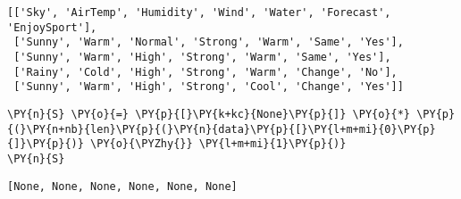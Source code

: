             \begin{tcolorbox}[breakable, size=fbox, boxrule=.5pt, pad at break*=1mm, opacityfill=0]
\begin{Verbatim}[commandchars=\\\{\}]
[['Sky', 'AirTemp', 'Humidity', 'Wind', 'Water', 'Forecast', 'EnjoySport'],
 ['Sunny', 'Warm', 'Normal', 'Strong', 'Warm', 'Same', 'Yes'],
 ['Sunny', 'Warm', 'High', 'Strong', 'Warm', 'Same', 'Yes'],
 ['Rainy', 'Cold', 'High', 'Strong', 'Warm', 'Change', 'No'],
 ['Sunny', 'Warm', 'High', 'Strong', 'Cool', 'Change', 'Yes']]
\end{Verbatim}
\end{tcolorbox}
        
    \begin{tcolorbox}[breakable, size=fbox, boxrule=1pt, pad at break*=1mm,colback=cellbackground, colframe=cellborder]
\begin{Verbatim}[commandchars=\\\{\}]
\PY{n}{S} \PY{o}{=} \PY{p}{[}\PY{k+kc}{None}\PY{p}{]} \PY{o}{*} \PY{p}{(}\PY{n+nb}{len}\PY{p}{(}\PY{n}{data}\PY{p}{[}\PY{l+m+mi}{0}\PY{p}{]}\PY{p}{)} \PY{o}{\PYZhy{}} \PY{l+m+mi}{1}\PY{p}{)}
\PY{n}{S}
\end{Verbatim}
\end{tcolorbox}

            \begin{tcolorbox}[breakable, size=fbox, boxrule=.5pt, pad at break*=1mm, opacityfill=0]
\begin{Verbatim}[commandchars=\\\{\}]
[None, None, None, None, None, None]
\end{Verbatim}
\end{tcolorbox}
        
